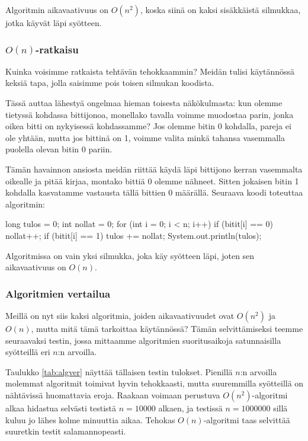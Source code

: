 Algoritmin aikavaativuus on $O(n^2)$, koska siinä on kaksi
sisäkkäistä silmukkaa, jotka käyvät läpi syötteen.

\subsubsection{$O(n)$-ratkaisu}

Kuinka voisimme ratkaista tehtävän tehokkaammin?
Meidän tulisi käytän\-nössä keksiä tapa, jolla saisimme
pois toisen silmukan koodista.

Tässä auttaa lähestyä ongelmaa hieman toisesta
näkökulmasta: kun olemme tietyssä kohdassa bittijonoa,
monellako tavalla voimme muodostaa parin,
jonka oikea bitti on nykyisessä kohdassamme?
Jos olemme bitin 0 kohdalla, pareja ei ole yhtään,
mutta jos bittinä on 1, voimme valita minkä tahansa
vasemmalla puolella olevan bitin 0 pariin.

Tämän havainnon ansiosta meidän riittää käydä läpi
bittijono kerran vasemmalta oikealle ja pitää kirjaa,
montako bittiä 0 olemme nähneet.
Sitten jokaisen bitin 1 kohdalla kasvatamme
vastausta tällä bittien 0 määrällä.
Seuraava koodi toteuttaa algoritmin:

\begin{code}
long tulos = 0;
int nollat = 0;
for (int i = 0; i < n; i++) {
    if (bitit[i] == 0) nollat++;
    if (bitit[i] == 1) tulos += nollat;
}
System.out.println(tulos);
\end{code}

Algoritmissa on vain yksi silmukka, joka käy syötteen läpi,
joten sen aikavaativuus on $O(n)$.

\subsubsection{Algoritmien vertailua}

Meillä on nyt siis kaksi algoritmia, joiden aikavaativuudet ovat
$O(n^2)$ ja $O(n)$, mutta mitä tämä tarkoittaa käytännössä?
Tämän selvittämiseksi teemme seuraavaksi testin,
jossa mittaamme algoritmien suoritusaikoja
satunnaisilla syötteillä eri $n$:n arvoilla.

Taulukko \ref{tab:algver} näyttää tällaisen testin tulokset.
Pienillä $n$:n arvoilla molemmat algoritmit toimivat
hyvin tehokkaasti, mutta suuremmilla syötteillä on
nähtävissä huomattavia eroja.
Raakaan voimaan perustuva $O(n^2)$-algoritmi
alkaa hidastua selvästi testistä $n=10000$ alkaen,
ja testissä $n=1000000$ sillä kuluu jo lähes kolme minuuttia aikaa.
Tehokas $O(n)$-algoritmi taas selvittää suuretkin testit
salamannopeasti.

